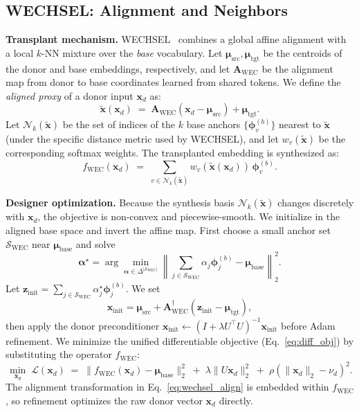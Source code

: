\documentclass{article}
\theoremstyle{plain}
\theoremstyle{definition}
\theoremstyle{remark}
\begin{document}
\subsection{WECHSEL: Alignment and Neighbors}
\label{sec:wechsel-breaker}

\noindent\textbf{Transplant mechanism.}
WECHSEL~\citep{minixhofer2021wechsel} combines a global affine alignment with a local $k$-NN mixture over the \emph{base} vocabulary.
Let $\boldsymbol{\mu}_{\text{src}}, \boldsymbol{\mu}_{\text{tgt}}$ be the centroids of the donor and base embeddings, respectively, and let $\mathbf{A}_{\mathrm{WEC}}$ be the alignment map from donor to base coordinates learned from shared tokens.
We define the \emph{aligned proxy} of a donor input $\mathbf{x}_d$ as:
\begin{equation}
\label{eq:wechsel_align}
\tilde{\mathbf{x}}(\mathbf{x}_d) \;=\; \mathbf{A}_{\mathrm{WEC}}(\mathbf{x}_d - \boldsymbol{\mu}_{\text{src}}) + \boldsymbol{\mu}_{\text{tgt}}.
\end{equation}
Let $\mathcal{N}_k(\tilde{\mathbf{x}})$ be the set of indices of the $k$ base anchors $\{\boldsymbol{\phi}^{(b)}_v\}$ nearest to $\tilde{\mathbf{x}}$ (under the specific distance metric used by WECHSEL), and let $w_v(\tilde{\mathbf{x}})$ be the corresponding softmax weights.
The transplanted embedding is synthesized as:
\begin{equation}
\label{eq:wechsel_func}
f_{\text{WEC}}(\mathbf{x}_d)
\;=\;
\sum_{v\in\mathcal{N}_k(\tilde{\mathbf{x}})} w_v(\tilde{\mathbf{x}}(\mathbf{x}_d))\,\boldsymbol{\phi}^{(b)}_v.
\end{equation}

\noindent\textbf{Designer optimization.}
Because the synthesis basis $\mathcal{N}_k(\tilde{\mathbf{x}})$ changes discretely with $\mathbf{x}_d$, the objective is non-convex and piecewise-smooth.
We initialize in the aligned base space and invert the affine map. First choose a small anchor set $\mathcal{S}_{\mathrm{WEC}}$ near $\boldsymbol{\mu}_{\text{base}}$ and solve
\[
\boldsymbol{\alpha}^\star
=
\arg\min_{\boldsymbol{\alpha}\in\Delta^{|\mathcal{S}_{\mathrm{WEC}}|}}
\left\|\sum_{j\in\mathcal{S}_{\mathrm{WEC}}}\alpha_j\boldsymbol{\phi}^{(b)}_j-\boldsymbol{\mu}_{\text{base}}\right\|_2^2.
\]
Let $\mathbf{z}_{\text{init}}=\sum_{j\in\mathcal{S}_{\mathrm{WEC}}}\alpha_j^\star\boldsymbol{\phi}^{(b)}_j$. We set
\[
\mathbf{x}_{\text{init}}
=
\boldsymbol{\mu}_{\text{src}}+\mathbf{A}_{\mathrm{WEC}}^\dagger(\mathbf{z}_{\text{init}}-\boldsymbol{\mu}_{\text{tgt}}),
\]
then apply the donor preconditioner $\mathbf{x}_{\text{init}}\leftarrow(I+\lambda U^\top U)^{-1}\mathbf{x}_{\text{init}}$ before Adam refinement.
We minimize the unified differentiable objective (Eq.~\ref{eq:diff_obj}) by substituting the operator $f_{\text{WEC}}$:
\begin{equation}
\label{eq:wechsel_obj}
\min_{\mathbf{x}_d} \; \mathcal{L}(\mathbf{x}_d)
\;=\;
 \big\|f_{\text{WEC}}(\mathbf{x}_d) - \boldsymbol{\mu}_{\text{base}}\big\|_2^2
\;+\;
\lambda \|U \mathbf{x}_d\|_2^2
\;+\;
\rho(\|\mathbf{x}_d\|_2-\nu_d)^2.
\end{equation}
The alignment transformation in Eq.~\ref{eq:wechsel_align} is embedded within $f_{\text{WEC}}$, so refinement optimizes the raw donor vector $\mathbf{x}_d$ directly.
\end{document}
